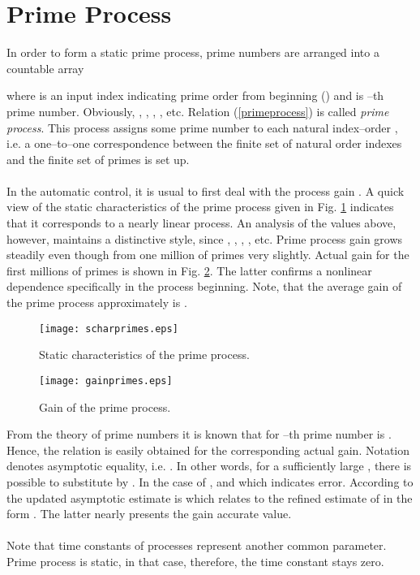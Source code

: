 \documentclass[12pt,a4paper,twoside]{article}
\begin{document}
\section{Prime Process}   

\vspace{0.3cm}\noindent In order to form a static prime process, prime numbers are arranged into a countable array 


where  is an input index indicating prime order from beginning () and  is --th prime number. Obviously, , , , ,  etc. Relation (\ref{primeprocess}) is called {\it prime process}. This process assigns some prime number to each natural index--order , i.e. a one--to--one correspondence between the finite set of natural order indexes and the finite set of primes is set up.\\
\\
In the automatic control, it is usual to first deal with the process gain . A quick view of the static characteristics of the prime process given in Fig. \ref{statchar} indicates that it corresponds to a nearly linear process. An analysis of the values above, however, maintains a distinctive style, since , , , ,  etc. Prime process gain grows steadily even though from one million of primes very slightly. Actual gain for the first  millions of primes is shown in Fig. \ref{gain}. The latter confirms a nonlinear dependence specifically in the process beginning. Note, that the average gain of the prime process approximately is .

\begin{figure}[htb]
\centering
\texttt{[image: scharprimes.eps]}
\caption{\small Static characteristics of the prime process.}
\label{statchar}
\end{figure}

\begin{figure}[htb]
\centering
\texttt{[image: gainprimes.eps]}
\caption{\small Gain of the prime process.}
\label{gain}
\end{figure}

\vspace{0.3cm}\noindent From the theory of prime numbers it is known \cite{cogu} that for --th prime number  is . Hence, the relation  is easily obtained for the corresponding actual gain. Notation  denotes asymptotic equality, i.e. . In other words, for a sufficiently large , there is possible to substitute  by . In the case of ,  and  which indicates  error. According to the updated asymptotic estimate  is  which relates to the refined estimate of  in the form . The latter nearly presents the gain accurate value.  \\  
\\
Note that time constants of processes represent another common parameter. Prime process is static, in that case, therefore, the time constant stays zero.
\end{document}
